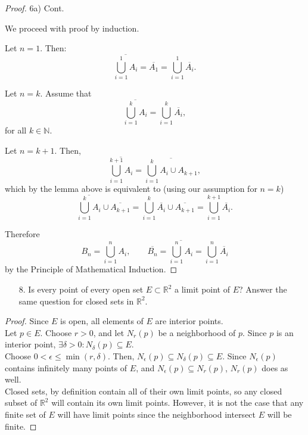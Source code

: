 \documentclass[10pt]{article}
\theoremstyle{definition}
\theoremstyle{plain}
\newcommand{\N}{\mathbb{N}}
\newcommand{\R}{\mathbb{R}}
\begin{document}
\begin{proof}
6a) Cont.

We proceed with proof by induction.

Let $n = 1.$ Then:
$$\overline{\bigcup^1_{i=1} A_i} = \overline{A_1}=\bigcup^1_{i=1} \overline{A_i}.$$

Let $n=k$. Assume that
$$\overline{\bigcup^k_{i=1} A_i} = \bigcup^k_{i=1} \overline{A_i},$$ for all $k\in\N$.

Let $n=k+1$. Then,
$$\overline{\bigcup^{k+1}_{i=1} A_i} = \overline{\bigcup^k_{i=1} A_i \cup A_{k+1}},$$
which by the lemma above is equivalent to (using our assumption for $n=k$)
$$\overline{\bigcup^k_{i=1} A_i} \cup \overline{A_{k+1}} = \bigcup^k_{i=1} \overline{A_i} \cup \overline{A_{k+1}} = \bigcup^{k+1}_{i=1} \overline{A_i}.$$

Therefore
$$B_n = \bigcup^n_{i=1} A_i, \qquad \overline{B_n} = \overline{\bigcup^n_{i=1} A_i} = \bigcup^n_{i=1} \overline{A_i}$$
by the Principle of Mathematical Induction.
\end{proof}



\pagebreak



\begin{enumerate}
\item[8.] Is every point of every open set $E \subset \R^2$ a limit point of $E$? Answer the same question for closed sets in $\R^2$.
\end{enumerate}

\begin{proof}
Since $E$ is open, all elements of $E$ are interior points. \\

Let $p\in E$. Choose $r>0$, and let $N_r(p)$ be a neighborhood of $p$. Since $p$ is an interior point, $\exists \delta > 0: N_\delta (p) \subseteq E$. \\

Choose $0<\epsilon \leq \min(r,\delta)$. Then, $N_\epsilon (p) \subseteq N_\delta (p) \subseteq E$. Since $N_\epsilon (p)$ contains infinitely many points of $E$, and $N_\epsilon (p) \subseteq N_r (p)$, $N_r(p)$ does as well. \\

Closed sets, by definition contain all of their own limit points, so any closed subset of $\R^2$ will contain its own limit points. However, it is not the case that any finite set of $E$ will have limit points since the neighborhood intersect $E$ will be finite.
\end{proof}
\end{document}
